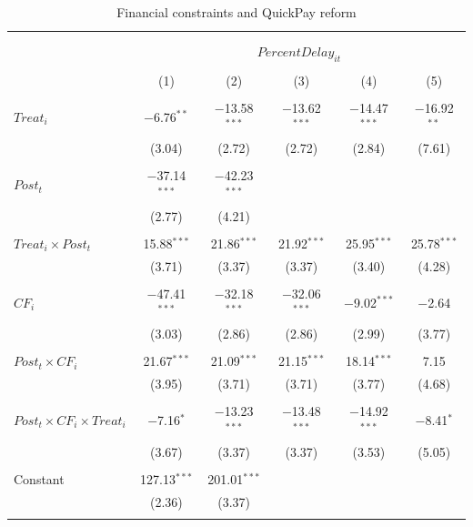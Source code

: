 \documentclass[
]{article}
\begin{document}
\begin{table}[H] \centering 
  \caption{Financial constraints and QuickPay reform} 
  \label{} 
\small 
\begin{tabular}{@{\extracolsep{-2pt}}lccccc} 
\\[-1.8ex]\hline 
\hline \\[-1.8ex] 
\\[-1.8ex] & \multicolumn{5}{c}{$PercentDelay_{it}$  } \\ 
\\[-1.8ex] & (1) & (2) & (3) & (4) & (5)\\ 
\hline \\[-1.8ex] 
 $Treat_i$ & $-$6.76$^{**}$ & $-$13.58$^{***}$ & $-$13.62$^{***}$ & $-$14.47$^{***}$ & $-$16.92$^{**}$ \\ 
  & (3.04) & (2.72) & (2.72) & (2.84) & (7.61) \\ 
  & & & & & \\ 
 $Post_t$ & $-$37.14$^{***}$ & $-$42.23$^{***}$ &  &  &  \\ 
  & (2.77) & (4.21) &  &  &  \\ 
  & & & & & \\ 
 $Treat_i \times Post_t$ & 15.88$^{***}$ & 21.86$^{***}$ & 21.92$^{***}$ & 25.95$^{***}$ & 25.78$^{***}$ \\ 
  & (3.71) & (3.37) & (3.37) & (3.40) & (4.28) \\ 
  & & & & & \\ 
 $CF_i$ & $-$47.41$^{***}$ & $-$32.18$^{***}$ & $-$32.06$^{***}$ & $-$9.02$^{***}$ & $-$2.64 \\ 
  & (3.03) & (2.86) & (2.86) & (2.99) & (3.77) \\ 
  & & & & & \\ 
 $Post_t \times CF_i$ & 21.67$^{***}$ & 21.09$^{***}$ & 21.15$^{***}$ & 18.14$^{***}$ & 7.15 \\ 
  & (3.95) & (3.71) & (3.71) & (3.77) & (4.68) \\ 
  & & & & & \\ 
 $Post_t \times CF_i \times Treat_i$ & $-$7.16$^{*}$ & $-$13.23$^{***}$ & $-$13.48$^{***}$ & $-$14.92$^{***}$ & $-$8.41$^{*}$ \\ 
  & (3.67) & (3.37) & (3.37) & (3.53) & (5.05) \\ 
  & & & & & \\ 
 Constant & 127.13$^{***}$ & 201.01$^{***}$ &  &  &  \\ 
  & (2.36) & (3.37) &  &  &  \\ 
  & & & & & \\ 

\end{tabular}
\end{table}
\end{document}
